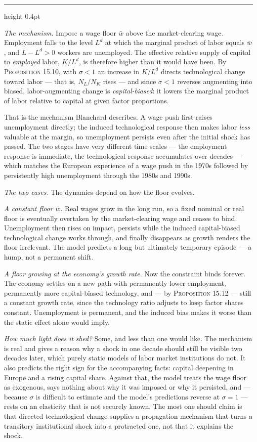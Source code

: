 \documentclass[11pt,letterpaper,reqno]{amsart}
\makeatletter
\newcommand{\as@head}[3]{%
  \par\addvspace{1.6ex}\penalty-200\relax
  \phantomsection
  \addcontentsline{toc}{subsection}{#1 #2\texorpdfstring{\ifx\relax#3\relax\else\quad #3\fi}{}}%
  {\color{RuleGrey}\hrule height 0.4pt}%
  \nobreak\vspace{0.8ex}\nobreak
  \noindent{\bfseries #1 #2}%
  \ifx\relax#3\relax\else\quad{\bfseries\itshape #3}\fi
  \par\nobreak\vspace{0.4ex}\nobreak
  \as@beginstatement
}
\newcommand{\as@beginstatement}{\begingroup\itshape\ignorespaces}
\newenvironment{aex}[2]{\as@head{Exercise}{#1}{#2}}{\par\addvspace{1.2ex}}
\newcommand{\bk}[1]{\textup{\textsc{#1}}}
\renewcommand{\as@beginstatement}{\ignorespaces}
\makeatother
\begin{document}
\begin{aex}{15.26}{}
\emph{The mechanism.}  Impose a wage floor $\bar w$ above the market-clearing wage.  Employment
falls to the level $L^{d}$ at which the marginal product of labor equals $\bar w$, and
$L-L^{d}>0$ workers are unemployed.  The effective relative supply of capital to \emph{employed}
labor, $K/L^{d}$, is therefore higher than it would have been.  By \bk{Proposition 15.10}, with
$\sigma<1$ an increase in $K/L^{d}$ directs technological change toward labor --- that is,
$N_L/N_K$ rises --- and since $\sigma<1$ reverses augmenting into biased, labor-augmenting change
is \emph{capital-biased}: it lowers the marginal product of labor relative to capital at given
factor proportions.

That is the mechanism Blanchard describes.  A wage push first raises unemployment directly; the
induced technological response then makes labor \emph{less} valuable at the margin, so
unemployment persists even after the initial shock has passed.  The two stages have very different
time scales --- the employment response is immediate, the technological response accumulates over
decades --- which matches the European experience of a wage push in the 1970s followed by
persistently high unemployment through the 1980s and 1990s.

\emph{The two cases.}  The dynamics depend on how the floor evolves.

\emph{A constant floor $\bar w$.}  Real wages grow in the long run, so a fixed nominal or real
floor is eventually overtaken by the market-clearing wage and ceases to bind.  Unemployment then
rises on impact, persists while the induced capital-biased technological change works through, and
finally disappears as growth renders the floor irrelevant.  The model predicts a long but
ultimately temporary episode --- a hump, not a permanent shift.

\emph{A floor growing at the economy's growth rate.}  Now the constraint binds forever.  The
economy settles on a new path with permanently lower employment, permanently more capital-biased
technology, and --- by \bk{Proposition 15.12} --- still a constant growth rate, since the
technology ratio adjusts to keep factor shares constant.  Unemployment is permanent, and the
induced bias makes it worse than the static effect alone would imply.

\emph{How much light does it shed?}  Some, and less than one would like.  The mechanism is real
and gives a reason why a shock in one decade should still be visible two decades later, which
purely static models of labor market institutions do not.  It also predicts the right sign for the
accompanying facts: capital deepening in Europe and a rising capital share.  Against that, the
model treats the wage floor as exogenous, says nothing about why it was imposed or why it
persisted, and --- because $\sigma$ is difficult to estimate and the model's predictions reverse
at $\sigma=1$ --- rests on an elasticity that is not securely known.  The most one should claim is
that directed technological change supplies a propagation mechanism that turns a transitory
institutional shock into a protracted one, not that it explains the shock.
\end{aex}
\end{document}
